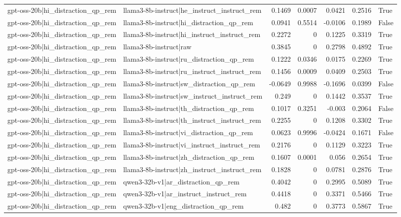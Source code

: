 \begin{table}
\begin{tabular}{l l r r r r l}
gpt-oss-20b|hi_distraction_qp_rem & llama3-8b-instruct|he_instruct_instruct_rem & 0.1469 & 0.0007 & 0.0421 & 0.2516 & True \\
gpt-oss-20b|hi_distraction_qp_rem & llama3-8b-instruct|hi_distraction_qp_rem & 0.0941 & 0.5514 & -0.0106 & 0.1989 & False \\
gpt-oss-20b|hi_distraction_qp_rem & llama3-8b-instruct|hi_instruct_instruct_rem & 0.2272 & 0 & 0.1225 & 0.3319 & True \\
gpt-oss-20b|hi_distraction_qp_rem & llama3-8b-instruct|raw & 0.3845 & 0 & 0.2798 & 0.4892 & True \\
gpt-oss-20b|hi_distraction_qp_rem & llama3-8b-instruct|ru_distraction_qp_rem & 0.1222 & 0.0346 & 0.0175 & 0.2269 & True \\
gpt-oss-20b|hi_distraction_qp_rem & llama3-8b-instruct|ru_instruct_instruct_rem & 0.1456 & 0.0009 & 0.0409 & 0.2503 & True \\
gpt-oss-20b|hi_distraction_qp_rem & llama3-8b-instruct|sw_distraction_qp_rem & -0.0649 & 0.9988 & -0.1696 & 0.0399 & False \\
gpt-oss-20b|hi_distraction_qp_rem & llama3-8b-instruct|sw_instruct_instruct_rem & 0.249 & 0 & 0.1442 & 0.3537 & True \\
gpt-oss-20b|hi_distraction_qp_rem & llama3-8b-instruct|th_distraction_qp_rem & 0.1017 & 0.3251 & -0.003 & 0.2064 & False \\
gpt-oss-20b|hi_distraction_qp_rem & llama3-8b-instruct|th_instruct_instruct_rem & 0.2255 & 0 & 0.1208 & 0.3302 & True \\
gpt-oss-20b|hi_distraction_qp_rem & llama3-8b-instruct|vi_distraction_qp_rem & 0.0623 & 0.9996 & -0.0424 & 0.1671 & False \\
gpt-oss-20b|hi_distraction_qp_rem & llama3-8b-instruct|vi_instruct_instruct_rem & 0.2176 & 0 & 0.1129 & 0.3223 & True \\
gpt-oss-20b|hi_distraction_qp_rem & llama3-8b-instruct|zh_distraction_qp_rem & 0.1607 & 0.0001 & 0.056 & 0.2654 & True \\
gpt-oss-20b|hi_distraction_qp_rem & llama3-8b-instruct|zh_instruct_instruct_rem & 0.1828 & 0 & 0.0781 & 0.2876 & True \\
gpt-oss-20b|hi_distraction_qp_rem & qwen3-32b-v1|ar_distraction_qp_rem & 0.4042 & 0 & 0.2995 & 0.5089 & True \\
gpt-oss-20b|hi_distraction_qp_rem & qwen3-32b-v1|ar_instruct_instruct_rem & 0.4418 & 0 & 0.3371 & 0.5466 & True \\
gpt-oss-20b|hi_distraction_qp_rem & qwen3-32b-v1|eng_distraction_qp_rem & 0.482 & 0 & 0.3773 & 0.5867 & True \\

\end{tabular}
\end{table}
